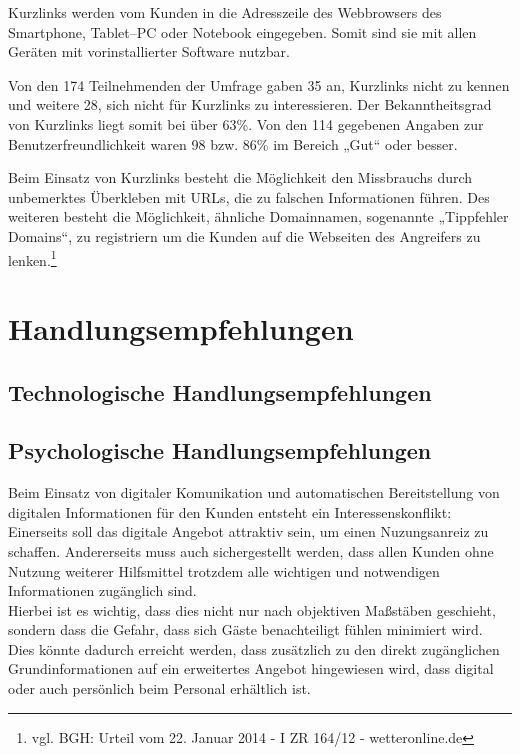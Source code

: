 Kurzlinks werden vom Kunden in die Adresszeile des Webbrowsers des Smartphone, Tablet–PC oder Notebook eingegeben. Somit sind sie mit allen Geräten mit vorinstallierter Software nutzbar. 

Von den 174 Teilnehmenden der Umfrage gaben 35 an, Kurzlinks nicht zu kennen und weitere 28, sich nicht für Kurzlinks zu interessieren. Der Bekanntheitsgrad von Kurzlinks liegt somit bei über 63\%. Von den 114 gegebenen Angaben zur Benutzerfreundlichkeit waren 98 bzw. 86\% im Bereich „Gut“ oder besser. 

Beim Einsatz von Kurzlinks besteht die Möglichkeit den Missbrauchs durch unbemerktes Überkleben mit \ac{URL}s, die zu falschen Informationen führen. Des weiteren besteht die Möglichkeit, ähnliche Domainnamen, sogenannte „Tippfehler Domains“, zu registriern um die Kunden auf die Webseiten des Angreifers zu lenken.\footnote{vgl. BGH: Urteil vom 22. Januar 2014 - I ZR 164/12 - wetteronline.de}


\newpage
\section{Handlungsempfehlungen} %
\label{sec:handlungsempfehlungen}

\subsection{Technologische Handlungsempfehlungen} %
\label{sub:technologische_handlungsempfehlungen}


\subsection{Psychologische Handlungsempfehlungen} %
\label{sub:psychologische_handlungsempfehlungen}
Beim Einsatz von digitaler Komunikation und automatischen Bereitstellung von digitalen Informationen für den Kunden entsteht ein Interessenskonflikt: Einerseits soll das digitale Angebot attraktiv sein, um einen Nuzungsanreiz zu schaffen. Andererseits muss auch sichergestellt werden, dass allen Kunden ohne Nutzung weiterer Hilfsmittel trotzdem alle wichtigen und notwendigen Informationen zugänglich sind.\\
Hierbei ist es wichtig, dass dies nicht nur nach objektiven Maßstäben geschieht, sondern dass die Gefahr, dass sich Gäste benachteiligt fühlen minimiert wird. Dies könnte dadurch erreicht werden, dass zusätzlich zu den direkt zugänglichen Grundinformationen auf ein erweitertes Angebot hingewiesen wird, dass digital oder auch persönlich beim Personal erhältlich ist.

